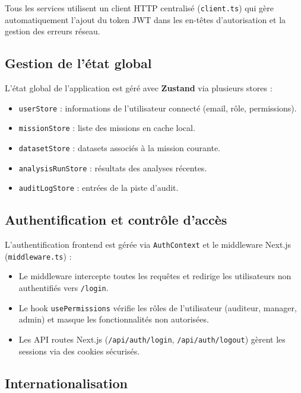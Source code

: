 \documentclass[12pt,a4paper,twoside]{report}
\begin{document}
Tous les services utilisent un client HTTP centralisé (\texttt{client.ts}) qui gère automatiquement l'ajout du token JWT dans les en-têtes d'autorisation et la gestion des erreurs réseau.

\subsection{Gestion de l'état global}

L'état global de l'application est géré avec \textbf{Zustand} via plusieurs stores :

\begin{itemize}
  \item \texttt{userStore} : informations de l'utilisateur connecté (email, rôle, permissions).
  \item \texttt{missionStore} : liste des missions en cache local.
  \item \texttt{datasetStore} : datasets associés à la mission courante.
  \item \texttt{analysisRunStore} : résultats des analyses récentes.
  \item \texttt{auditLogStore} : entrées de la piste d'audit.
\end{itemize}

\subsection{Authentification et contrôle d'accès}

L'authentification frontend est gérée via \texttt{AuthContext} et le middleware Next.js (\texttt{middleware.ts}) :

\begin{itemize}
  \item Le middleware intercepte toutes les requêtes et redirige les utilisateurs non authentifiés vers \texttt{/login}.
  \item Le hook \texttt{usePermissions} vérifie les rôles de l'utilisateur (auditeur, manager, admin) et masque les fonctionnalités non autorisées.
  \item Les API routes Next.js (\texttt{/api/auth/login}, \texttt{/api/auth/logout}) gèrent les sessions via des cookies sécurisés.
\end{itemize}

\subsection{Internationalisation}
\end{document}
